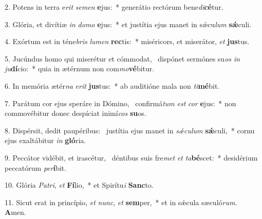2. Potens in terra e\textit{rit} \textit{se}\textit{men} \textbf{e}jus:~*  generátio rectórum bene\textit{di}\textbf{cé}tur.\

3. Glória, et divítiæ \textit{in} \textit{do}\textit{mo} \textbf{e}jus:~*  et justítia ejus manet in sǽcu\textit{lum} \textbf{sǽ}culi.\

4. Exórtum est in téne\textit{bris} \textit{lu}\textit{men} \textbf{rec}tis:~*  miséricors, et miserátor, \textit{et} \textbf{jus}tus.\

5. Jucúndus homo qui miserétur et cómmodat, \dag\  dispónet sermónes su\textit{os} \textit{in} \textit{ju}\textbf{dí}cio:~*  quia in ætérnum non com\textit{mo}\textbf{vé}bitur.\

6. In memória ætér\textit{na} \textit{e}\textit{rit} \textbf{jus}tus:~*  ab auditióne mala non \textit{ti}\textbf{mé}bit.\

7. Parátum cor ejus speráre in Dómino, \dag\  confirmá\textit{tum} \textit{est} \textit{cor} \textbf{e}jus:~*  non commovébitur donec despíciat inimí\textit{cos} \textbf{su}os.\

8. Dispérsit, dedit paupéribus: \dag\  justítia ejus manet in \textit{sǽ}\textit{cu}\textit{lum} \textbf{sǽ}culi,~*  cornu ejus exaltábitur \textit{in} \textbf{gló}ria.\

9. Peccátor vidébit, et irascétur, \dag\  déntibus suis fre\textit{met} \textit{et} \textit{ta}\textbf{bé}scet:~*  desidérium peccatórum \textit{per}\textbf{í}bit.\

10. Glória \textit{Pa}\textit{tri}, \textit{et} \textbf{Fí}lio,~*  et Spirítu\textit{i} \textbf{Sanc}to.\

11. Sicut erat in princípio, \textit{et} \textit{nunc}, \textit{et} \textbf{sem}per,~*  et in sǽcula sæculó\textit{rum}. \textbf{A}men.\

